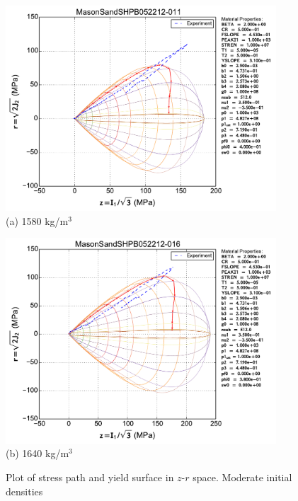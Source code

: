 \documentclass[11pt,a4paper]{article}
\begin{document}
\begin{appendices}
\begin{figure}[htbp!]
  \begin{minipage}{0.5\textwidth}
    \centering
    \includegraphics[width=0.9\textwidth]{FIGS/MasonSandSHPB052212-011_vs_expt_zr.pdf}\\
    (a) 1580 kg/m$^3$
  \end{minipage}
  \begin{minipage}{0.5\textwidth}
    \centering
    \includegraphics[width=0.9\textwidth]{FIGS/MasonSandSHPB052212-016_vs_expt_zr.pdf}\\
    (b) 1640 kg/m$^3$
  \end{minipage}
  \caption{Plot of stress path and yield surface in $z$-$r$ space.
           Moderate initial densities}
  \label{fig:shpb_dry_zr_density_0}
\end{figure}


\end{appendices}
\end{document}
